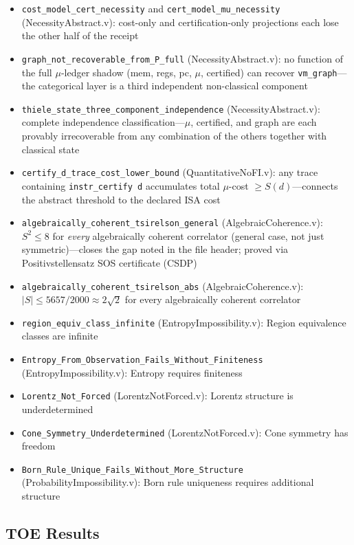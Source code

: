 \begin{itemize}
    \item \texttt{cost\_model\_cert\_necessity} and \texttt{cert\_model\_mu\_necessity} (NecessityAbstract.v): cost-only and certification-only projections each lose the other half of the receipt
    \item \texttt{graph\_not\_recoverable\_from\_P\_full} (NecessityAbstract.v): no function of the full $\mu$-ledger shadow (mem, regs, pc, $\mu$, certified) can recover \texttt{vm\_graph}---the categorical layer is a third independent non-classical component
    \item \texttt{thiele\_state\_three\_component\_independence} (NecessityAbstract.v): complete independence classification---$\mu$, certified, and graph are each provably irrecoverable from any combination of the others together with classical state
    \item \texttt{certify\_d\_trace\_cost\_lower\_bound} (QuantitativeNoFI.v): any trace containing \texttt{instr\_certify d} accumulates total $\mu$-cost $\ge S(d)$---connects the abstract threshold to the declared ISA cost
    \item \texttt{algebraically\_coherent\_tsirelson\_general} (AlgebraicCoherence.v): $S^2 \le 8$ for \emph{every} algebraically coherent correlator (general case, not just symmetric)---closes the gap noted in the file header; proved via Positivstellensatz SOS certificate (CSDP)
    \item \texttt{algebraically\_coherent\_tsirelson\_abs} (AlgebraicCoherence.v): $|S| \le 5657/2000 \approx 2\sqrt{2}$ for every algebraically coherent correlator
    \item \texttt{region\_equiv\_class\_infinite} (EntropyImpossibility.v): Region equivalence classes are infinite
    \item \texttt{Entropy\_From\_Observation\_Fails\_Without\_Finiteness} (EntropyImpossibility.v): Entropy requires finiteness
    \item \texttt{Lorentz\_Not\_Forced} (LorentzNotForced.v): Lorentz structure is underdetermined
    \item \texttt{Cone\_Symmetry\_Underdetermined} (LorentzNotForced.v): Cone symmetry has freedom
    \item \texttt{Born\_Rule\_Unique\_Fails\_Without\_More\_Structure} (ProbabilityImpossibility.v): Born rule uniqueness requires additional structure
\end{itemize}

\subsection{TOE Results}

